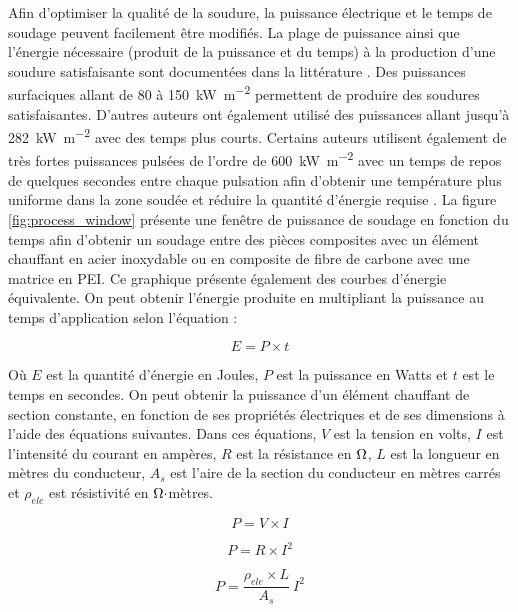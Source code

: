 Afin d'optimiser la qualité de la soudure, la puissance électrique et le temps de soudage peuvent facilement être modifiés. 
La plage de puissance ainsi que l'énergie nécessaire (produit de la puissance et du temps) à la production d'une soudure satisfaisante sont documentées dans la littérature \cite{Hou1999a}. 
Des puissances surfaciques allant de 80 à \SI{150}{\kilo\watt\per\square\metre} permettent de produire des soudures satisfaisantes. 
D'autres auteurs ont également utilisé des puissances allant jusqu'à \SI{282}{\kilo\watt\per\square\metre} \cite{Dube2007} avec des temps plus courts. 
Certains auteurs utilisent également de très fortes puissances pulsées de l'ordre de \SI{600}{\kilo\watt\per\square\metre} avec un temps de repos de quelques secondes entre chaque pulsation afin d'obtenir une température plus uniforme dans la zone soudée et réduire la quantité d'énergie requise  \cite{Arias1996}. 
La figure \ref{fig:process_window} présente une fenêtre de puissance de soudage en fonction du temps afin d'obtenir un soudage entre des pièces composites avec un élément chauffant en acier inoxydable ou en composite de fibre de carbone avec une matrice en PEI. 
Ce graphique présente également des courbes d'énergie équivalente. 
On peut obtenir l'énergie produite en multipliant la puissance au temps d'application selon l'équation : 

\begin{equation}
E = P \times t
\end{equation}

Où $E$ est la quantité d'énergie en Joules, $P$ est la puissance en Watts et $t$ est le temps en secondes. 
On peut obtenir la puissance d'un élément chauffant de section constante, en fonction de ses propriétés électriques et de ses dimensions à l'aide des équations suivantes. Dans ces équations, $V$ est la tension en volts, $I$ est l'intensité du courant en ampères, $R$ est la résistance en $\ohm$, $L$ est la longueur en mètres du conducteur, $A_s$ est l'aire de la section du conducteur en mètres carrés et $\rho_{ele}$ est résistivité en $\ohm \cdot$mètres. 

\begin{equation}
P = V \times I
\end{equation}

\begin{equation}
P = R \times I^2
\end{equation}

\begin{equation}
P = \frac{\rho_{ele} \times L}{A_s} \ I^2
\end{equation}

